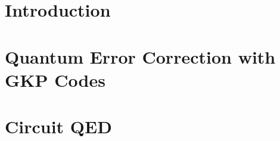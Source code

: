 \documentclass[12pt]{mitthesis}
\begin{document}

% 

% 

\sffamily  
{}
\tableofcontents
\clearpage

\rmfamily

\chapter{Introduction\label{ch:1_Introduction}}

\printbibliography[heading=subbibliography, title = References]
\clearpage

\chapter{Quantum Error Correction with GKP Codes\label{ch:2_QEC}}

\printbibliography[heading=subbibliography, title = References]
\clearpage

\chapter{Circuit QED\label{ch:3_cQED}}
\clearpage
\end{document}
